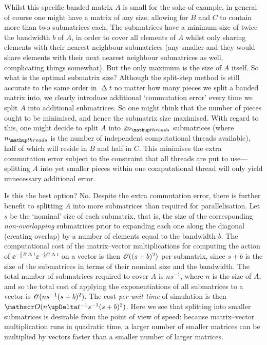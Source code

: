 Whilst this specific banded matrix $A$ is small for the sake of example, in general of course one might have a matrix of any size, allowing for $B$ and $C$ to contain more than two submatrices each. The submatrices have a minimum size of twice the bandwidth $b$ of $A$, in order to cover all elements of $A$ whilst only sharing elements with their nearest neighbour submatrices (any smaller and they would share elements with their next nearest neighbour submatrices as well, complicating things somewhat). But the only maximum is the size of $A$ itself. So what is the optimal submatrix size? Although the split-step method is still accurate to the same order in $\upDelta t$ no matter how many pieces we split a banded matrix into, we clearly introduce additional `commutation error' every time we split $A$ into additional submatrices. So one might think that the number of pieces ought to be minimised, and hence the submatrix size maximised. With regard to this, one might decide to split $A$ into $2n_\up{threads}$ submatrices (where $n_\up{threads}$ is the number of independent computational threads available), half of which will reside in $B$ and half in $C$. This minimises the extra commutation error subject to the constraint that all threads are put to use---splitting $A$ into yet smaller pieces within one computational thread will only yield unnecessary additional error.

Is this the best option? No. Despite the extra commutation error, there is further benefit to splitting $A$ into more submatrices than required for parallelisation. Let $s$ be the `nominal' size of each submatrix, that is, the size of the corresponding \emph{non-overlapping} submatrices prior to expanding each one along the diagonal (creating overlap) by a number of elements equal to the bandwidth $b$. The computational cost of the matrix--vector multiplications for computing the action of $\ee^{-\frac\ii\hbar B\upDelta t}\ee^{-\frac\ii\hbar C\upDelta t}$ on a vector is then $\mathscr{O}((s+b)^2)$ per submatrix, since $s+b$ is the size of the submatrices in terms of their nominal size and the bandwidth. The total number of submatrices required to cover $A$ is $ns^{-1}$, where $n$ is the size of $A$, and so the total cost of applying the exponentiations of all submatrices to a vector is $\mathscr{O}(ns^{-1}(s+b)^2)$. The cost \emph{per unit time} of simulation is then $\Ord{n\upDelta t^{-1}s^{-1}(s+b)^2}$. Here we see that splitting into smaller submatrices is desirable from the point of view of speed: because matrix--vector multiplication runs in quadratic time, a larger number of smaller matrices can be multiplied by vectors faster than a smaller number of larger matrices.

